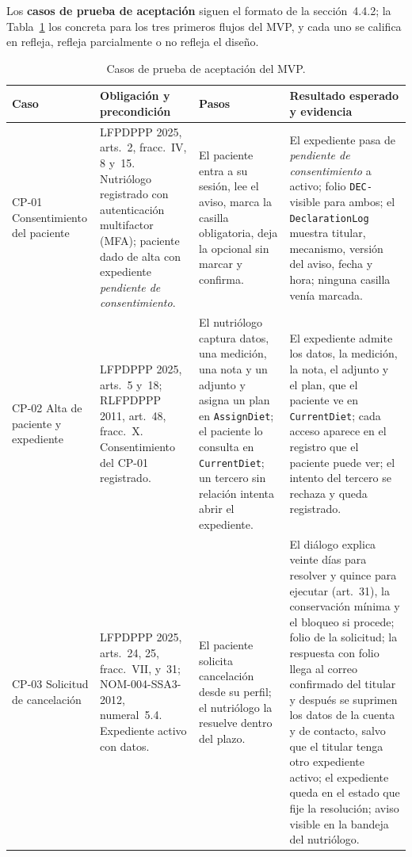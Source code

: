 \documentclass[12pt, a4paper]{article}
\begin{document}
Los \textbf{casos de prueba de aceptación} siguen el formato de la
sección~4.4.2; la Tabla~\ref{tab:casos-prueba} los concreta para los
tres primeros flujos del MVP, y cada uno se califica en refleja, refleja
parcialmente o no refleja el diseño.
 
\begin{table}[!ht]
  \centering
  \caption{Casos de prueba de aceptación del MVP.}
  \label{tab:casos-prueba}
  \footnotesize
  \begin{tabularx}{\textwidth}{>{\raggedright\arraybackslash}p{2.1cm} X X X}
    \toprule
    \textbf{Caso} & \textbf{Obligación y precondición} & \textbf{Pasos} & \textbf{Resultado esperado y evidencia} \\
    \midrule
    CP-01 Consentimiento del paciente & LFPDPPP 2025, arts.~2, fracc.~IV, 8 y~15. Nutriólogo registrado con autenticación multifactor (MFA); paciente dado de alta con expediente \textit{pendiente de consentimiento}. & El paciente entra a su sesión, lee el aviso, marca la casilla obligatoria, deja la opcional sin marcar y confirma. & El expediente pasa de \textit{pendiente de consentimiento} a activo; folio \texttt{DEC-} visible para ambos; el \texttt{DeclarationLog} muestra titular, mecanismo, versión del aviso, fecha y hora; ninguna casilla venía marcada. \\
    CP-02 Alta de paciente y expediente & LFPDPPP 2025, arts.~5 y~18; RLFPDPPP 2011, art.~48, fracc.~X. Consentimiento del CP-01 registrado. & El nutriólogo captura datos, una medición, una nota y un adjunto y asigna un plan en \texttt{AssignDiet}; el paciente lo consulta en \texttt{CurrentDiet}; un tercero sin relación intenta abrir el expediente. & El expediente admite los datos, la medición, la nota, el adjunto y el plan, que el paciente ve en \texttt{CurrentDiet}; cada acceso aparece en el registro que el paciente puede ver; el intento del tercero se rechaza y queda registrado. \\
    CP-03 Solicitud de cancelación & LFPDPPP 2025, arts.~24, 25, fracc.~VII, y~31; NOM-004-SSA3-2012, numeral~5.4. Expediente activo con datos. & El paciente solicita cancelación desde su perfil; el nutriólogo la resuelve dentro del plazo. & El diálogo explica veinte días para resolver y quince para ejecutar (art.~31), la conservación mínima y el bloqueo si procede; folio de la solicitud; la respuesta con folio llega al correo confirmado del titular y después se suprimen los datos de la cuenta y de contacto, salvo que el titular tenga otro expediente activo; el expediente queda en el estado que fije la resolución; aviso visible en la bandeja del nutriólogo. \\
    \bottomrule
  \end{tabularx}
\end{table}
 
\end{document}
